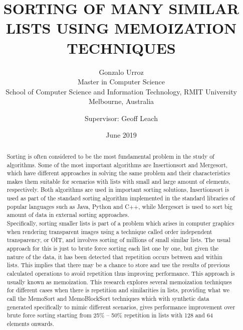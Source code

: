 \documentclass[a4paper,12pt]{article}
\begin{document}
\title{\uppercase{Sorting of many similar lists using memoization techniques}} 
\author{Gonzalo Urroz\\
{\small Master in Computer Science }\\
{\small School of Computer Science and Information Technology, RMIT University } \\
{\small Melbourne, Australia }\\
\and Supervisor: Geoff Leach
}

\date{June 2019}
\maketitle

\begin{abstract}
Sorting is often considered to be the most fundamental problem in the study of algorithms. Some of the most important algorithms are Insertionsort and Mergesort, which have different approaches in solving the same problem and their characteristics makes them suitable for scenarios with lists with small and large amount of elements, respectively. Both algorithms are used in important sorting solutions, Insertionsort is used as part of the standard sorting algorithm implemented in the standard libraries of popular languages such as Java, Python and C++, while Mergesort is used to sort big amount of data in external sorting approaches.\\
Specifically, sorting smaller lists is part of a problem which arises in computer graphics when rendering transparent images using a technique called order independent transparency, or OIT, and involves sorting of millions of small similar lists. The usual approach for this is just to brute force sorting each list one by one, but given the nature of the data, it has been detected that repetition occurs between and within lists. This implies that there may be a chance to store and use the results of previous calculated operations to avoid repetition thus improving performance. This approach is usually known as memoization. 
This research explores several memoization techniques for different cases when there is repetition and similarities in lists, providing what we call the MemoSort and MemoBlockSort techniques which with synthetic data generated specifically to mimic different scenarios, gives performance improvement over brute force sorting starting from 25\% -- 50\% repetition in lists with 128 and 64 elements onwards.

\end{abstract}
\end{document}
